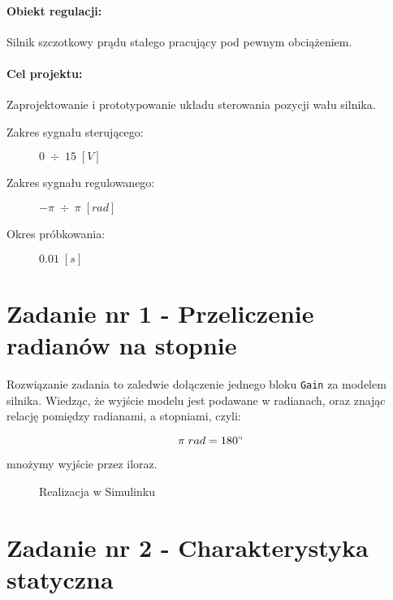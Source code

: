 \documentclass[11 pt]{article}
\begin{document}
\paragraph{Obiekt regulacji:} Silnik szczotkowy prądu stałego pracujący pod pewnym obciążeniem.

\paragraph{Cel projektu:} Zaprojektowanie i prototypowanie układu sterowania pozycji wału silnika.\\

\begin{description}
\item[Zakres sygnału sterującego:] $0 \; \div \; 15 \; [V]$
\item[Zakres sygnału regulowanego:] $-\pi \; \div \; \pi \; [rad]$
\item[Okres próbkowania:] $0.01 \; [s]$
\end{description}

\newpage

\setcounter{section}{1}
\setcounter{figure}{0}
\section*{Zadanie nr 1 - Przeliczenie radianów na stopnie}

Rozwiązanie zadania to zaledwie dołączenie jednego bloku \texttt{Gain} za modelem silnika. Wiedząc, że wyjście modelu jest podawane w radianach, oraz znając relację pomiędzy radianami, a stopniami, czyli:

\begin{equation*}
\pi \; rad = 180 \degree
\end{equation*}

mnożymy wyjście przez iloraz.

\begin{figure}[h!]
	\center
	\caption{Realizacja w Simulinku}
\end{figure}

\newpage

\setcounter{section}{2}
\setcounter{figure}{0}
\section*{Zadanie nr 2 - Charakterystyka statyczna}
\end{document}
